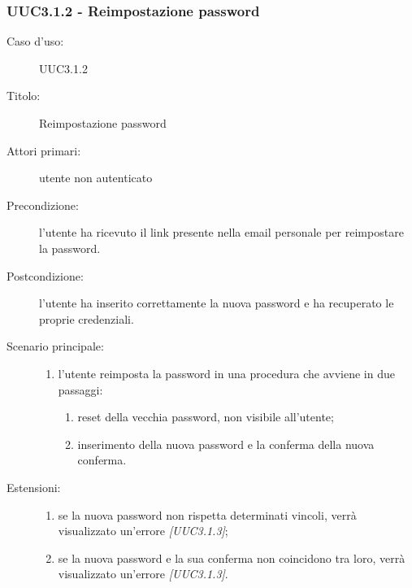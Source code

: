 \documentclass[../../../analisi-dei-requisiti.tex]{subfiles}
\begin{document}
\subsubsection{UUC3.1.2 - Reimpostazione password}%
\label{subs:UUC3.1.2}
\begin{description}
  \item[Caso d’uso:] UUC3.1.2
  \item[Titolo:] Reimpostazione password
  \item[Attori primari:] utente non autenticato
  \item[Precondizione:] l'utente ha ricevuto il link presente nella email personale per reimpostare la password.
  \item[Postcondizione:] l'utente ha inserito correttamente la nuova password e ha recuperato le proprie credenziali.
  \item[Scenario principale:]
        \begin{enumerate}
          \item l'utente reimposta la password in una procedura che avviene in due passaggi:
                \begin{enumerate}
                  \item reset della vecchia password, non visibile all'utente;
                  \item inserimento della nuova password e la conferma della nuova conferma.
                \end{enumerate}
        \end{enumerate}
  \item[Estensioni:]
        \begin{enumerate}
          \item se la nuova password non rispetta determinati vincoli, verrà visualizzato un'errore \emph{[UUC3.1.3]};
          \item se la nuova password e la sua conferma non coincidono tra loro, verrà visualizzato un'errore \emph{[UUC3.1.3]}.
        \end{enumerate}
\end{description}
\end{document}
